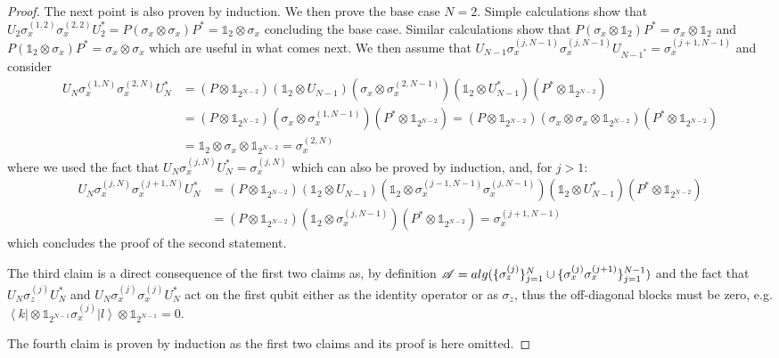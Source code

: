 \documentclass[10pt,a4paper]{amsart}
\newcommand{\As}{\mathscr{A}}
\newcommand{\alg}{{\rm alg}}
\newcommand{\bra}[1]{\left< #1 \right|}
\newcommand{\ket}[1]{\left| #1 \right>}
\newcommand{\one}{\mathbb{1}}
\begin{document}
\begin{proof}
    The next point is also proven by induction. 
    We then prove the base case $N=2$. Simple calculations show that \(U_2\sigma_x^{(1,2)}\sigma_x^{(2,2)} U_2^* = P (\sigma_x\otimes\sigma_x) P^* = \one_2\otimes\sigma_x\) concluding the base case. Similar calculations show that \(P(\sigma_x\otimes\one_2)P^* = \sigma_x\otimes \one_2 \) and \(P(\one_2\otimes\sigma_x)P^* = \sigma_x\otimes \sigma_x \) which are useful in what comes next. We then assume that $U_{N-1} \sigma_x^{(j,N-1)}\sigma_x^{(j,N-1)} U_{N-1^*} = \sigma_x^{(j+1,N-1)}$ and consider
    \begin{align*}
        U_N \sigma_x^{(1,N)}\sigma_x^{(2,N)}U_N^* &= (P\otimes\one_{2^{N-2}})(\one_2\otimes U_{N-1}) (\sigma_x\otimes \sigma_x^{(2,N-1)}) (\one_2\otimes U_{N-1}^*) (P^*\otimes\one_{2^{N-2}})\\
        &= (P\otimes\one_{2^{N-2}}) (\sigma_x\otimes \sigma_x^{(1,N-1)}) (P^*\otimes\one_{2^{N-2}}) = (P\otimes\one_{2^{N-2}}) (\sigma_x\otimes \sigma_x \otimes \one_{2^{N-2}} ) (P^*\otimes\one_{2^{N-2}}) \\&= \one_2\otimes\sigma_x\otimes \one_{2^{N-2}} = \sigma_x^{(2,N)}
    \end{align*}
    where we used the fact that $U_N\sigma_x^{(j,N)}U_N^* = \sigma_x^{(j,N)}$ which can also be proved by induction, and, for $j>1$:
    \begin{align*}
        U_N \sigma_x^{(j,N)}\sigma_x^{(j+1,N)}U_N^* &= (P\otimes\one_{2^{N-2}})(\one_2\otimes U_{N-1}) (\one_2\otimes \sigma_x^{(j-1,N-1)}\sigma_x^{(j,N-1)}) (\one_2\otimes U_{N-1}^*) (P^*\otimes\one_{2^{N-2}})\\
        &= (P\otimes\one_{2^{N-2}})(\one_2\otimes \sigma_x^{(j,N-1)}) (P^*\otimes\one_{2^{N-2}}) = \sigma_x^{(j+1,N-1)}
    \end{align*}
    which concludes the proof of the second statement. 

    The third claim is a direct consequence of the first two claims as, by definition $\As = \alg(\{\sigma_z^{(j)}\}_{j=1}^N\cup\{\sigma_x^{(j)}\sigma_x^{(j+1)}\}_{j=1}^{N-1})$ and the fact that $U_N \sigma_z^{(j)} U_N^*$ and $U_N \sigma_x^{(j)}\sigma_x^{(j)} U_N^*$ act on the first qubit either as the identity operator or as $\sigma_z$, thus the off-diagonal blocks must be zero, e.g. $\bra{k}\otimes\one_{2^{N-1}} \sigma_x^{(j)} \ket{l}\otimes\one_{2^{N-1}} = 0$.

    The fourth claim is proven by induction as the first two claims and its proof is here omitted.
\end{proof}
\end{document}
